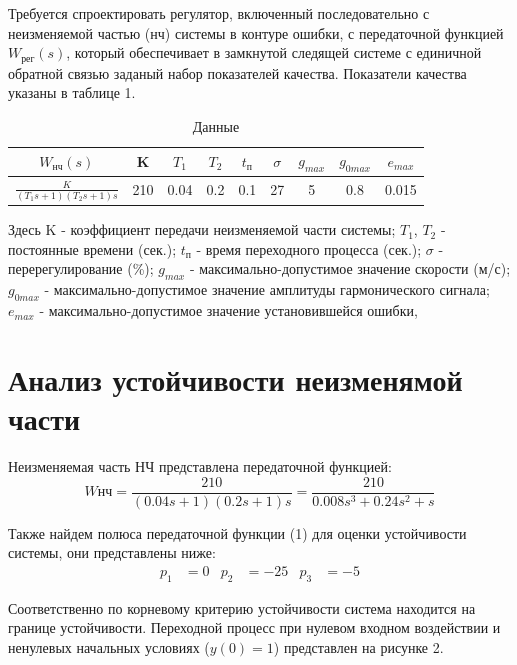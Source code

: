 \documentclass[russian, utf8]{eskdtext}
\renewcommand{\arraystretch}{1.3}
\begin{document}
Требуется спроектировать регулятор, включенный последовательно с неизменяемой частью (нч) системы в контуре ошибки, с передаточной функцией $W_\text{рег}(s)$, который обеспечивает в замкнутой следящей системе с единичной обратной связью заданый набор показателей качества. Показатели качества указаны в таблице 1. \par
\begin{table}[h!]
    \centering
    \begin{threeparttable}        
        \caption{Данные}
        \def\arraystretch{2}
        \begin{tabular} {|c|c|c|c|c|c|c|c|c|}
            \hline
            $W_\text{нч}(s)$ & K & $T_1$ & $T_2$ & $t_\text{п}$ & $\sigma$ & $g_{max}$ & $g_{0max}$ & $e_{max}$ \\ \hline 
            $\displaystyle\frac{K}{(T_1s + 1)(T_2s + 1)s}$ & 210 & 0.04 & 0.2 & 0.1 & 27 & 5 & 0.8 & 0.015 \\ [2mm] \hline 
        \end{tabular}
    \end{threeparttable}
\end{table}
Здесь
K - коэффициент передачи неизменяемой части системы;
$T_1$, $T_2$ - постоянные времени (сек.);
$t_\text{п}$ - время переходного процесса (сек.);
$\sigma$ - перерегулирование (\%);
$g_{max}$ - максимально-допустимое значение скорости (м/с);
$g_{0max}$ - максимально-допустимое значение амплитуды гармонического сигнала;
$e_{max}$ - максимально-допустимое значение установившейся ошибки, \par

\newpage
\section{Анализ устойчивости неизменямой части}

Неизменяемая часть НЧ представлена передаточной функцией:
\begin{equation}
    W\text{нч} = \frac{210}{(0.04s + 1)(0.2s + 1)s} = \frac{210}{0.008s^3 + 0.24s^2 + s}
\end{equation}

Также найдем полюса передаточной функции (1) для оценки устойчивости системы, они представлены ниже:
\begin{align*}
    p_1 & = 0 & p_2 & = -25 & p_3 & = -5
\end{align*}

Соответственно по корневому критерию устойчивости система находится на границе устойчивости. Переходной процесс при нулевом входном воздействии и ненулевых начальных условиях ($y(0) = 1$) представлен на рисунке 2.
\end{document}
